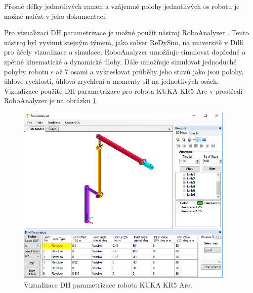 Přesné délky jednotlivých ramen a vzájemné polohy jednotlivých os robotu je možné nalézt v jeho dokumentaci.

Pro vizualizaci DH parametrizace je možné použít nástroj RoboAnalyzer \cite{roboanalyzer}. Tento nástroj byl vyvinut stejným týmem, jako solver ReDySim, na univerzitě v Dillí pro účely vizualizace a simulace. RoboAnalyzer umožňuje simulovat dopředné a zpětné kinematické a dynamické úlohy. Dále umožňuje simulovat jednoduché pohyby robotu s až 7 osami a vykreslovat průběhy jeho stavů jako jsou polohy, úhlové rychlosti, úhlová zrychlení a momenty sil na jednotlivých osách. Vizualizace použité DH parametrizace pro robota KUKA KR5 Arc v prostředí RoboAnalyzer je na obrázku \ref{dh_kuka_pic}.
\\
\begin{figure}[ht]
\includegraphics[width=0.95\textwidth]{pic_dh_kuka}
\caption{Vizualizace DH parametrizace robota KUKA KR5 Arc.}
\label{dh_kuka_pic}
\end{figure}

